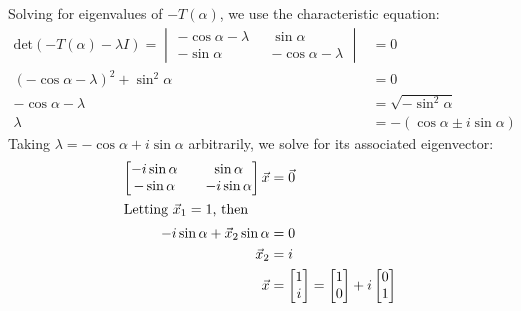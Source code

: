 \documentclass[11pt, oneside]{article}
\begin{document}
Solving for eigenvalues of \( -T(\alpha) \),
we use the characteristic equation:
\begin{align*}
  \text{det}(-T(\alpha) - \lambda I) = 
  \begin{vmatrix} -\cos \alpha - \lambda &&  \sin \alpha \\
                  -\sin \alpha           && -\cos \alpha - \lambda
  \end{vmatrix} &= 0 \\
  (-\cos \alpha - \lambda)^2 + \sin^2 \alpha &= 0 \\
  -\cos \alpha - \lambda &= \sqrt{-\sin^2 \alpha} \\
                 \lambda &= -(\cos \alpha \pm i \sin \alpha)
\end{align*}
Taking \( \lambda = -\cos \alpha + i \sin \alpha \)
arbitrarily, we solve for its associated eigenvector:
\begin{align*}
  \begin{bmatrix} -i \sin \alpha &&    \sin \alpha \\
                    -\sin \alpha && -i \sin \alpha
  \end{bmatrix} \vec{x} &= \vec{0} \\
  \shortintertext{Letting \( \vec{x}_1 = 1 \), then}
  -i \sin \alpha + \vec{x}_2 \sin \alpha &= 0 \\
  \vec{x}_2 &= i \\
  \vec{x} &= \begin{bmatrix} 1 \\ i \end{bmatrix}
  = \begin{bmatrix} 1 \\ 0 \end{bmatrix} + i 
    \begin{bmatrix} 0 \\ 1 \end{bmatrix}
\end{align*}
\end{document}
